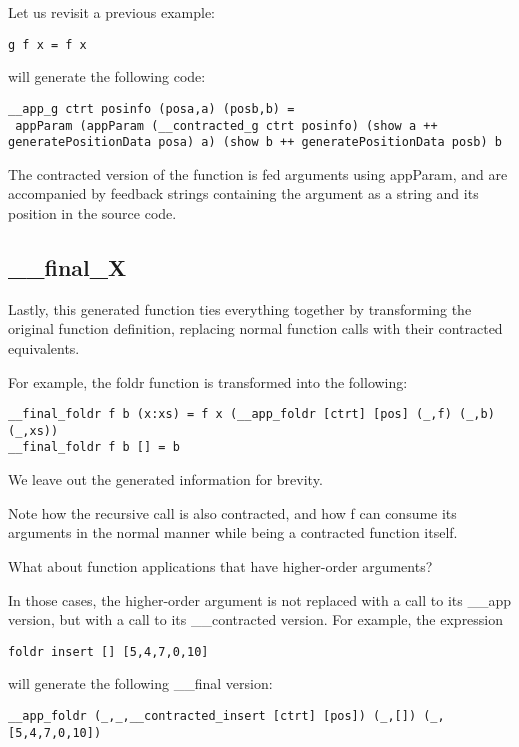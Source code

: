 \documentclass[10pt,a4paper]{article}
\begin{document}
Let us revisit a previous example:

\begin{lstlisting}
g f x = f x
\end{lstlisting}

will generate the following code:
\begin{lstlisting}
__app_g ctrt posinfo (posa,a) (posb,b) =
 appParam (appParam (__contracted_g ctrt posinfo) (show a ++ generatePositionData posa) a) (show b ++ generatePositionData posb) b
\end{lstlisting}

The contracted version of the function is fed arguments using appParam, and are accompanied by feedback strings containing the argument as a string and its position in the source code.

\subsection{\_\_final\_X}

Lastly, this generated function ties everything together by transforming the original function definition, replacing normal function calls with their contracted equivalents.

For example, the foldr function is transformed into the following:

\begin{lstlisting}
__final_foldr f b (x:xs) = f x (__app_foldr [ctrt] [pos] (_,f) (_,b) (_,xs))
__final_foldr f b [] = b
\end{lstlisting}

We leave out the generated information for brevity.

Note how the recursive call is also contracted, and how f can consume its arguments in the normal manner while being a contracted function itself.

What about function applications that have higher-order arguments?

In those cases, the higher-order argument is not replaced with a call to its \_\_app version, but with a call to its \_\_contracted version.
For example, the expression

\begin{lstlisting}
foldr insert [] [5,4,7,0,10]
\end{lstlisting}

will generate the following \_\_final version:

\begin{lstlisting}
__app_foldr (_,_,__contracted_insert [ctrt] [pos]) (_,[]) (_,[5,4,7,0,10])
\end{lstlisting}
\end{document}
